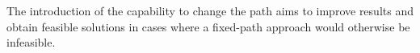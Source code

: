 \documentclass[../../thesis.tex]{subfiles}
\begin{document}
The introduction of the capability to change the path aims to improve results and obtain feasible solutions in cases where a fixed-path approach would otherwise be infeasible.
\end{document}

